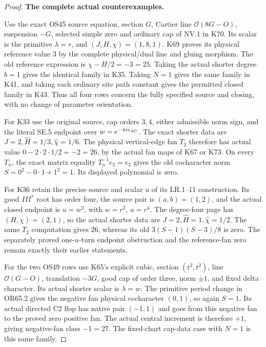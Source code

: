 \begin{proof}
\par\medskip\noindent\textbf{The complete actual counterexamples.}\par\nopagebreak[4]
Use the exact OS45 source equation, section \(G\), Cartier
line \(\mathcal O(8G-O)\), suspension \(-G\), selected simple
zero and ordinary cap of NV.1 in K70. Its scalar is the
primitive \(\lambda=r\), and \((J,H,\chi)=(1,8,1)\).
K69 proves its physical reference value \(3\) by the complete
physical/dual line and gluing morphism. The old reference
expression is \(\chi-H/2=-3=25\). Taking the actual shorter
degree \(b=1\) gives the identical family in K35. Taking
\(N=1\) gives the same family in K41, and taking each ordinary
site path constant gives the permitted closed family in K43.
Thus all four rows concern the fully specified source and
closing, with no change of parameter orientation.

For K33 use the original source, cap orders \(3,4\), either
admissible norm sign, and the literal SE.5 endpoint over
\(w=e^{-\pi i c_{\rm AC}}\). The exact shorter data are
\(J=2,\widehat H=1/3,\widehat\chi=1/6\). The physical
vertical-edge fan \(T_2\) therefore has actual value
\(0-2\cdot2\cdot1/2=-2=26\), by the actual fan maps of
K67 or K73. On every \(T_n\), the exact matrix equality
\(T_n^{-1}e_2=e_2\) gives the old cocharacter norm
\(S=0^2-0\cdot1+1^2=1\). Its displayed polynomial is zero.

For K36 retain the precise source and scalar \(u\) of its
LR.1--11 construction. Its good \(III^*\) root has order four,
the source pair is \((a,b)=(1,2)\), and the actual closed
endpoint is \(u=w^2\), with \(w=r^2\), \(u=r^4\).
The degree-four page has \((H,\chi)=(2,1)\), so the actual
shorter data are \(J=2,\widehat H=1,\widehat\chi=1/2\).
The same \(T_2\) computation gives \(26\), whereas its
old \(3(S-1)(S-3)/8\) is zero. The separately proved
one-\(u\)-turn endpoint obstruction and the reference-fan
zero remain exactly their earlier statements.

For the two OS49 rows use K65's explicit cubic, section
\((t^2,t^2)\), line \(\mathcal O(G-O)\), translation
\(-3G\), good cap of order three, norm \(\pm1\), and
fixed delta character. Its actual shorter scalar is
\(\lambda=w\). The primitive period change in OR65.2
gives the negative fan physical cocharacter \((0,1)\), so
again \(S=1\). Its actual directed C2 flop has native pair
\((-1,1)\) and goes from this negative fan to the proved
zero positive fan. The actual central increment is therefore
\(+1\), giving negative-fan class \(-1=27\). The
fixed-chart cap-data case with \(N=1\) is this same family.


\end{proof}
